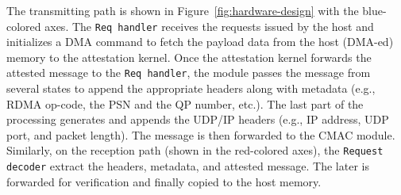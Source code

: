 The transmitting path is shown in Figure~\ref{fig:hardware-design} with the blue-colored axes. The {\tt Req handler} receives the requests issued by the host and initializes a DMA command to fetch the payload data from the host (DMA-ed) memory to the attestation kernel. Once the attestation kernel forwards the attested message to the {\tt Req handler}, the module passes the message from several states to append the appropriate headers along with metadata (e.g., RDMA op-code, the PSN and the QP number, etc.). The last part of the processing generates and appends the UDP/IP headers (e.g., IP address, UDP port, and packet length). The message is then forwarded to the CMAC module. Similarly, on the reception path (shown in the red-colored axes), the {\tt Request decoder} extract the headers, metadata, and attested message. The later is forwarded for verification and finally copied to the host memory.





